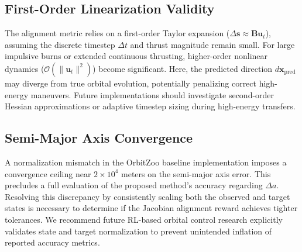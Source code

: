 \documentclass[paper]{ieice}
\begin{document}
\subsection{First-Order Linearization Validity}
The alignment metric relies on a first-order Taylor expansion ($\Delta \mathbf{s} \approx \mathbf{B}\mathbf{u}_t$), assuming the discrete timestep $\Delta t$ and thrust magnitude remain small. For large impulsive burns or extended continuous thrusting, higher-order nonlinear dynamics ($\mathcal{O}(\|\mathbf{u}_t\|^2)$) become significant. Here, the predicted direction $d\mathbf{x}_{\mathrm{pred}}$ may diverge from true orbital evolution, potentially penalizing correct high-energy maneuvers. Future implementations should investigate second-order Hessian approximations or adaptive timestep sizing during high-energy transfers.


\subsection{Semi-Major Axis Convergence}
A normalization mismatch in the OrbitZoo baseline implementation imposes a convergence ceiling near $2 \times 10^4$ meters on the semi-major axis error. This precludes a full evaluation of the proposed method's accuracy regarding $\Delta a$. Resolving this discrepancy by consistently scaling both the observed and target states is necessary to determine if the Jacobian alignment reward achieves tighter tolerances. We recommend future RL-based orbital control research explicitly validates state and target normalization to prevent unintended inflation of reported accuracy metrics.

\end{document}
